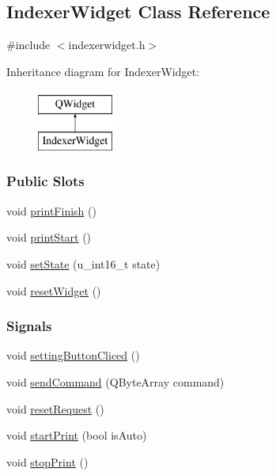 \hypertarget{classIndexerWidget}{}\subsection{Indexer\+Widget Class Reference}
\label{classIndexerWidget}


{\ttfamily \#include $<$indexerwidget.\+h$>$}

Inheritance diagram for Indexer\+Widget\+:\begin{figure}[H]
\begin{center}
\leavevmode
\includegraphics[height=2.000000cm]{classIndexerWidget}
\end{center}
\end{figure}
\subsubsection*{Public Slots}
\begin{DoxyCompactItemize}
\item 
void \mbox{\hyperlink{classIndexerWidget_aebacace6caa148439e640d27b6142e5e}{print\+Finish}} ()
\item 
void \mbox{\hyperlink{classIndexerWidget_ac3c769e1ba1434dcbebb4b2b4bdc79e4}{print\+Start}} ()
\item 
void \mbox{\hyperlink{classIndexerWidget_a80cbb27852773541d0fe05d44b571f20}{set\+State}} (u\+\_\+int16\+\_\+t state)
\item 
void \mbox{\hyperlink{classIndexerWidget_a198605c5b4c5f008b0baef3b19b0cdea}{reset\+Widget}} ()
\end{DoxyCompactItemize}
\subsubsection*{Signals}
\begin{DoxyCompactItemize}
\item 
void \mbox{\hyperlink{classIndexerWidget_a5b786596789da83ff37ad1c8df223d0f}{setting\+Button\+Cliced}} ()
\item 
void \mbox{\hyperlink{classIndexerWidget_ae1a3d974cf2f93385e76e635df2a4c07}{send\+Command}} (Q\+Byte\+Array command)
\item 
void \mbox{\hyperlink{classIndexerWidget_aa88ef42bb8acd6b90405d7e38784d7af}{reset\+Request}} ()
\item 
void \mbox{\hyperlink{classIndexerWidget_a31cbe782d1f10a27c6f80924c8445ae5}{start\+Print}} (bool is\+Auto)
\item 
void \mbox{\hyperlink{classIndexerWidget_a1fff5da56d91020863b52f17a4dc6f49}{stop\+Print}} ()
\end{DoxyCompactItemize}

